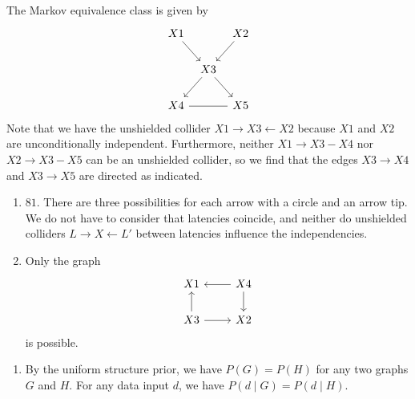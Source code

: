 \documentclass{article}
\newcommand{\cprob}[2]{\prob{#1\mathbin|#2}}
\newcommand{\prob}[1]{P(#1)}
\begin{document}
\begin{ex}
The Markov equivalence class is given by
\begin{equation*}
\begin{tikzcd}[column sep=tiny]
X1
  \ar{dr}
  &
  {} &
X2
  \ar{dl}
  \\
  {} &
X3
  \ar{dr}
  \ar{dl}
  \\
X4
  \ar[-]{rr}
  &
  {} &
X5
\end{tikzcd}
\end{equation*}
Note that we have the unshielded collider $X1\rightarrow X3\leftarrow X2$ because
$X1$ and $X2$ are unconditionally independent. Furthermore, neither
$X1\to X3-X4$ nor $X2\to X3-X5$ can be an unshielded collider, so we find that
the edges $X3\to X4$ and $X3\to X5$ are directed as indicated.
\end{ex}

\begin{ex}
\begin{enumerate}
\item $81$. There are three possibilities for each arrow with a circle and an
arrow tip. We do not have to consider that latencies coincide, and neither
do unshielded colliders $L\rightarrow X\leftarrow L'$ between latencies 
influence the independencies.
\item Only the graph
\begin{equation*}
\begin{tikzcd}
X1
  &
X4 \ar{l} \ar{d}
  \\
X3 \ar{r} \ar{u}
  &
X2
\end{tikzcd}
\end{equation*}
is possible.
\end{enumerate}
\end{ex}

\begin{ex}
\begin{enumerate}
\item By the uniform structure prior, we have $P(G)=P(H)$ for any two graphs
$G$ and $H$. For any data input $d$, we have $\cprob{d}{G}=\cprob{d}{H}$.
\end{enumerate}
\end{ex}
\end{document}
